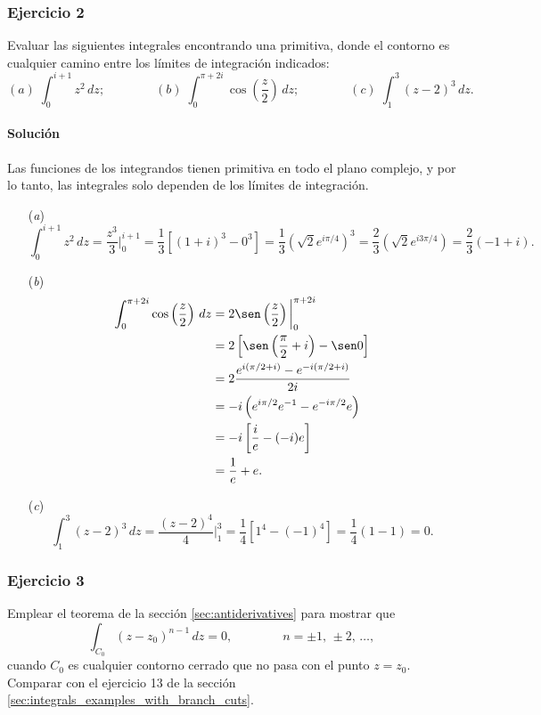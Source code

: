 \documentclass[a4paper]{report}
\begin{document}
\subsubsection*{Ejercicio 2}

Evaluar las siguientes integrales encontrando una primitiva, donde el contorno es cualquier camino entre los límites de integración indicados:
\[
 (\textit{a})\;\int_0^{i+1}z^2\,dz;\qquad\qquad(\textit{b})\;\int_0^{\pi+2i}\cos\left(\frac{z}{2}\right)\,dz;
 \qquad\qquad(\textit{c})\;\int_1^3(z-2)^3\,dz.
\]

\paragraph{Solución} Las  funciones de los integrandos tienen primitiva en todo el plano complejo, y por lo tanto, las integrales solo dependen de los límites de integración.
\begin{enumerate}
 \item[(\textit{a})] 
 \[
  \int_0^{i+1}z^2\,dz=\frac{z^3}{3}\bigg|_0^{i+1}=\frac{1}{3}\left[(1+i)^3-0^3\right]=\frac{1}{3}\left(\sqrt{2}e^{i\pi/4}\right)^3
  =\frac{2}{3}\left(\sqrt{2}e^{i3\pi/4}\right)=\frac{2}{3}(-1+i).
 \]
 \item[(\textit{b})] 
 \begin{align*}
  \int_0^{\pi+2i}\cos\left(\frac{z}{2}\right)\,dz&=2\sen\left(\frac{z}{2}\right)\bigg|_0^{\pi+2i}\\
   &=2\left[\sen\left(\frac{\pi}{2}+i\right)-\sen0\right]\\
   &=2\frac{e^{i(\pi/2+i)}-e^{-i(\pi/2+i)}}{2i}\\
   &=-i\left(e^{i\pi/2}e^{-1}-e^{-i\pi/2}e\right)\\
   &=-i\left[\frac{i}{e}-(-i)e\right]\\
   &=\frac{1}{e}+e.
 \end{align*}
 \item[(\textit{c})]
 \[
  \int_1^3(z-2)^3\,dz=\frac{(z-2)^4}{4}\bigg|_1^3=\frac{1}{4}\left[1^4-(-1)^4\right]=\frac{1}{4}(1-1)=0.
 \]
\end{enumerate}

\subsubsection*{Ejercicio 3}

Emplear el teorema de la sección \ref{sec:antiderivatives} para mostrar que 
\[
 \int_{C_0}(z-z_0)^{n-1}\,dz=0,
 \qquad\qquad
 n=\pm1,\,\pm2,\,\dots,
\]
cuando \(C_0\) es cualquier contorno cerrado que no pasa con el punto \(z=z_0\). Comparar con el ejercicio 13 de la sección \ref{sec:integrals_examples_with_branch_cuts}.
\end{document}
